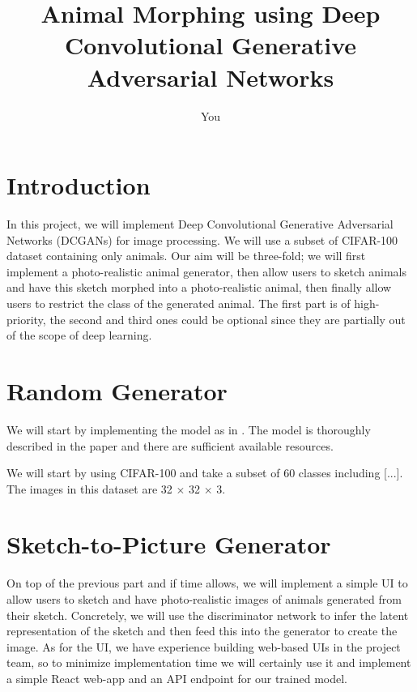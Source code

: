 \documentclass[a4paper]{article}
\title{Animal Morphing using Deep Convolutional Generative Adversarial Networks}
\author{
	You
}
\begin{document}
\maketitle


\section{Introduction}
In this project, we will implement Deep Convolutional Generative Adversarial Networks (DCGANs)  \cite{DBLP:journals/corr/RadfordMC15} for image processing. We will use a subset of CIFAR-100 dataset containing only animals. Our aim will be three-fold; we will first implement a photo-realistic animal generator, then allow users to sketch animals and have this sketch morphed into a photo-realistic animal, then finally allow users to restrict the class of the generated animal. The first part is of high-priority, the second and third ones could be optional since they are partially out of the scope of deep learning.


%
%
%
\section{Random Generator}
We will start by implementing the model as in \cite{DBLP:journals/corr/RadfordMC15}. The model is thoroughly described in the paper and there are sufficient available resources.

We will start by using CIFAR-100 and take a subset of 60 classes including [...]. The images in this dataset are 32 $\times$ 32 $\times$ 3.



%
%
%
\section{Sketch-to-Picture Generator}

On top of the previous part and if time allows, we will implement a simple UI to allow users to sketch and have photo-realistic images of animals generated from their sketch. Concretely, we will use the discriminator network to infer the latent representation of the sketch and then feed this into the generator to create the image. As for the UI, we have experience building web-based UIs in the project team, so to minimize implementation time we will certainly use it and implement a simple React web-app and an API endpoint for our trained model.  
\end{document}
